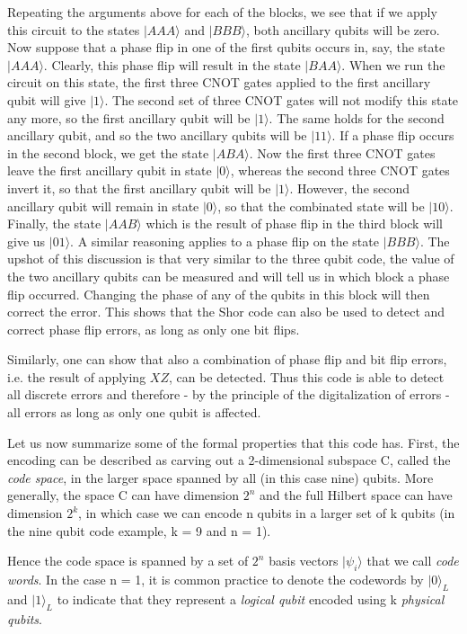 \documentclass[a4paper, draft]{article}
\theoremstyle{own}
\theoremstyle{remark}
\begin{document}
Repeating the arguments above for each of the blocks, we see that if we apply this circuit to the states $|AAA \rangle$ and $|BBB \rangle$, both ancillary qubits will be zero. Now suppose that a phase flip in one of the first qubits occurs in, say, the state $|AAA \rangle$. Clearly, this phase flip will result in the state $|BAA \rangle$. When we run the circuit on this state, the first three CNOT gates applied to the first ancillary qubit will give $|1 \rangle$. The second set of three CNOT gates will not modify this state any more, so the first ancillary qubit will be $|1 \rangle$. The same holds for the second ancillary qubit, and so the two ancillary qubits will be $|11 \rangle$. If a phase flip occurs in the second block, we get the state $|ABA \rangle$. Now the first three CNOT gates leave the first ancillary qubit in state $|0 \rangle$, whereas the second three CNOT gates invert it, so that the first ancillary qubit will be $|1 \rangle$. However, the second ancillary qubit will remain in state $|0 \rangle$, so that the combinated state will be $|10 \rangle$. Finally, the state $|AAB \rangle$ which is the result of phase flip in the third block will give us $|01 \rangle$. A similar reasoning applies to a phase flip on the state $|BBB \rangle$. The upshot of this discussion is that very similar to the three qubit code, the value of the two ancillary qubits can be measured and will tell us in which block a phase flip occurred. Changing the phase of any of the qubits in this block will then correct the error. This shows that the Shor code can also be used to detect and correct phase flip errors, as long as only one bit flips. 

Similarly, one can show that also a combination of phase flip and bit flip errors, i.e. the result of applying $XZ$, can be detected. Thus this code is able to detect all discrete errors and therefore - by the principle of the digitalization of errors - all errors as long as only one qubit is affected.

Let us now summarize some of the formal properties that this code has. First, the encoding can be described as carving out a 2-dimensional subspace C, called the {\em code space}, in the larger space spanned by all (in this case nine) qubits. More generally, the space C can have dimension $2^n$ and the full Hilbert space can have dimension $2^k$, in which case we can encode n qubits in a larger set of k qubits (in the nine qubit code example, k = 9 and n = 1). 

Hence the code space is spanned by a set of $2^n$ basis vectors $|\psi_i \rangle$ that we call \emph{code words}. In the case n = 1, it is common practice to denote the codewords by $|0 \rangle_L$ and $|1 \rangle_L$ to indicate that they represent a \emph{logical qubit} encoded using k \emph{physical qubits}. 
\end{document}
